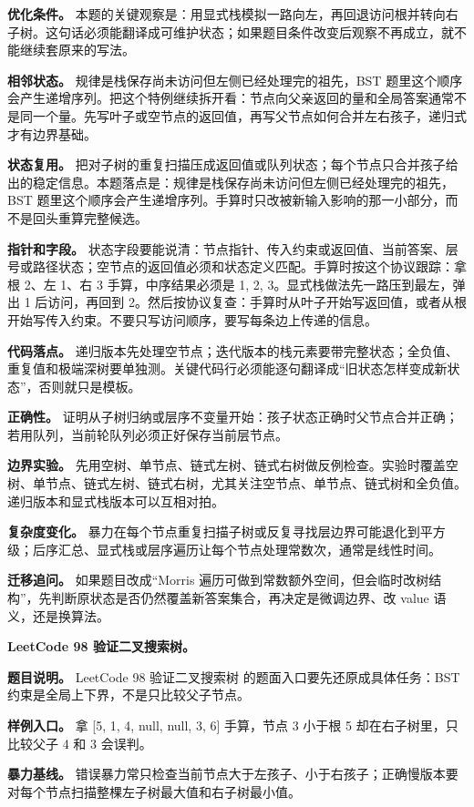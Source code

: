 \textbf{优化条件。} 本题的关键观察是：用显式栈模拟一路向左，再回退访问根并转向右子树。这句话必须能翻译成可维护状态；如果题目条件改变后观察不再成立，就不能继续套原来的写法。

\textbf{相邻状态。} 规律是栈保存尚未访问但左侧已经处理完的祖先，BST 题里这个顺序会产生递增序列。把这个特例继续拆开看：节点向父亲返回的量和全局答案通常不是同一个量。先写叶子或空节点的返回值，再写父节点如何合并左右孩子，递归式才有边界基础。

\textbf{状态复用。} 把对子树的重复扫描压成返回值或队列状态；每个节点只合并孩子给出的稳定信息。本题落点是：规律是栈保存尚未访问但左侧已经处理完的祖先，BST 题里这个顺序会产生递增序列。手算时只改被新输入影响的那一小部分，而不是回头重算完整候选。

\textbf{指针和字段。} 状态字段要能说清：节点指针、传入约束或返回值、当前答案、层号或路径状态；空节点的返回值必须和状态定义匹配。手算时按这个协议跟踪：拿根 2、左 1、右 3 手算，中序结果必须是 1, 2, 3。显式栈做法先一路压到最左，弹出 1 后访问，再回到 2。然后按协议复查：手算时从叶子开始写返回值，或者从根开始写传入约束。不要只写访问顺序，要写每条边上传递的信息。

\textbf{代码落点。} 递归版本先处理空节点；迭代版本的栈元素要带完整状态；全负值、重复值和极端深树要单独测。关键代码行必须能逐句翻译成“旧状态怎样变成新状态”，否则就只是模板。

\textbf{正确性。} 证明从子树归纳或层序不变量开始：孩子状态正确时父节点合并正确；若用队列，当前轮队列必须正好保存当前层节点。

\textbf{边界实验。} 先用空树、单节点、链式左树、链式右树做反例检查。实验时覆盖空树、单节点、链式左树、链式右树，尤其关注空节点、单节点、链式树和全负值。递归版本和显式栈版本可以互相对拍。

\textbf{复杂度变化。} 暴力在每个节点重复扫描子树或反复寻找层边界可能退化到平方级；后序汇总、显式栈或层序遍历让每个节点处理常数次，通常是线性时间。

\textbf{迁移追问。} 如果题目改成“Morris 遍历可做到常数额外空间，但会临时改树结构”，先判断原状态是否仍然覆盖新答案集合，再决定是微调边界、改 value 语义，还是换算法。

\noindent\textbf{LeetCode 98 验证二叉搜索树。}

\textbf{题目说明。} LeetCode 98 验证二叉搜索树 的题面入口要先还原成具体任务：BST 约束是全局上下界，不是只比较父子节点。

\textbf{样例入口。} 拿 [5, 1, 4, null, null, 3, 6] 手算，节点 3 小于根 5 却在右子树里，只比较父子 4 和 3 会误判。

\textbf{暴力基线。} 错误暴力常只检查当前节点大于左孩子、小于右孩子；正确慢版本要对每个节点扫描整棵左子树最大值和右子树最小值。

